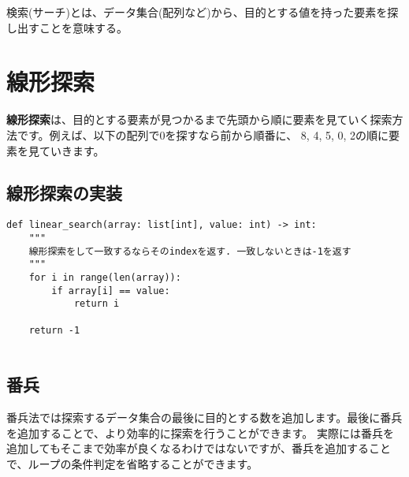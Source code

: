 検索(サーチ)とは、データ集合(配列など)から、目的とする値を持った要素を探し出すことを意味する。

\section{線形探索}

\textbf{線形探索}は、目的とする要素が見つかるまで先頭から順に要素を見ていく探索方法です。例えば、以下の配列で0を探すなら前から順番に、
8, 4, 5, 0, 2の順に要素を見ていきます。

\vspace{0.5cm}

\begin{center}
\end{center}

\subsection{線形探索の実装}
\begin{lstlisting}[caption=線形探索の実装, frame=TRBL, label={linear}]
def linear_search(array: list[int], value: int) -> int:
    """
    線形探索をして一致するならそのindexを返す. 一致しないときは-1を返す
    """
    for i in range(len(array)):
        if array[i] == value:
            return i
    
    return -1


\end{lstlisting}

\subsection{番兵}

番兵法では探索するデータ集合の最後に目的とする数を追加します。最後に番兵を追加することで、より効率的に探索を行うことができます。
実際には番兵を追加してもそこまで効率が良くなるわけではないですが、番兵を追加することで、ループの条件判定を省略することができます。

